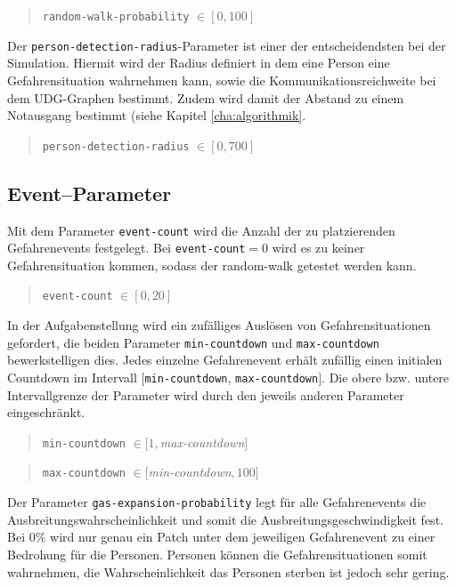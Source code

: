 \begin{quote}
\verb|random-walk-probability| $\in [0, 100]$
\end{quote}

Der \verb|person-detection-radius|-Parameter ist einer der entscheidendsten bei der Simulation. Hiermit wird der Radius definiert in dem eine Person eine Gefahrensituation wahrnehmen kann, sowie die Kommunikationsreichweite bei dem UDG-Graphen bestimmt. Zudem wird damit der Abstand zu einem Notausgang bestimmt (siehe Kapitel \ref{cha:algorithmik}.

\begin{quote}
\verb|person-detection-radius| $\in [0, 700]$
\end{quote}



\subsection{Event--Parameter}
\label{sec:gui_event}

Mit dem Parameter \verb|event-count| wird die Anzahl der zu platzierenden Gefahrenevents festgelegt. Bei \verb|event-count|$ = 0$ wird es zu keiner Gefahrensituation kommen, sodass der random-walk getestet werden kann.

\begin{quote}
\verb|event-count| $\in [0, 20]$
\end{quote}

In der Aufgabenstellung wird ein zufälliges Auslösen von Gefahrensituationen gefordert, die beiden Parameter \verb|min-countdown| und \verb|max-countdown| bewerkstelligen dies. Jedes einzelne Gefahrenevent erhält zufällig einen initialen Countdown im Intervall $[$\verb|min-countdown|, \verb|max-countdown|$]$. Die obere bzw. untere Intervallgrenze der Parameter wird durch den jeweils anderen Parameter eingeschränkt.  

\begin{quote}
\verb|min-countdown| $\in [1, $\textit{max-countdown}$]$
\end{quote}

\begin{quote}
\verb|max-countdown| $\in [$\textit{min-countdown}$, 100]$
\end{quote}

Der Parameter \verb|gas-expansion-probability| legt für alle Gefahrenevents die Ausbreitungswahrscheinlichkeit und somit die Ausbreitungsgeschwindigkeit fest. Bei $0 \%$ wird nur genau ein Patch unter dem jeweiligen Gefahrenevent zu einer Bedrohung für die Personen. Personen können die Gefahrensituationen somit wahrnehmen, die Wahrscheinlichkeit das Personen sterben ist jedoch sehr gering. 

